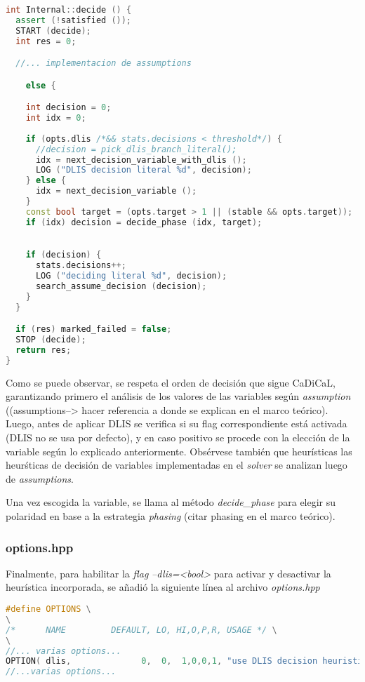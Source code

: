 \begin{lstlisting}[escapechar=!., language=C++]
int Internal::decide () {
  assert (!satisfied ());
  START (decide);
  int res = 0;

  //... implementacion de assumptions

    else {

    int decision = 0;
    int idx = 0;
    
    if (opts.dlis /*&& stats.decisions < threshold*/) {
      //decision = pick_dlis_branch_literal();
      idx = next_decision_variable_with_dlis ();
      LOG ("DLIS decision literal %d", decision);
    } else {
      idx = next_decision_variable ();
    }
    const bool target = (opts.target > 1 || (stable && opts.target));
    if (idx) decision = decide_phase (idx, target);
    

    if (decision) {
      stats.decisions++;
      LOG ("deciding literal %d", decision);
      search_assume_decision (decision);
    }
  }

  if (res) marked_failed = false;
  STOP (decide);
  return res;
}
\end{lstlisting}

Como se puede observar, se respeta el orden de decisi\'on que sigue CaDiCaL, garantizando primero el an\'alisis de los valores de las variables seg\'un \textit{assumption} ((assumptions--> hacer referencia a donde se explican en el marco te\'orico). Luego, antes de aplicar DLIS se verifica si su flag correspondiente est\'a activada (DLIS no se usa por defecto), y en caso positivo se procede con la elecci\'on de la variable seg\'un lo explicado anteriormente. Obs\'ervese tambi\'en que heur\'isticas las heur\'sticas de decisi\'on de variables implementadas en el \textit{solver} se analizan luego de \textit{assumptions}.

Una vez escogida la variable, se llama al m\'etodo \textit{decide\_phase} para elegir su polaridad en base a la estrategia \textit{phasing} (citar phasing en el marco te\'orico).

\subsubsection{options.hpp}
Finalmente, para habilitar la \textit{flag} \textit{--dlis=<bool>} para activar y desactivar la heur\'istica incorporada, se a\~nadi\'o la siguiente l\'inea al archivo \textit{options.hpp}

\begin{lstlisting}[escapechar=!._, language=C++]
#define OPTIONS \
\
/*      NAME         DEFAULT, LO, HI,O,P,R, USAGE */ \
\
//... varias options...
OPTION( dlis,              0,  0,  1,0,0,1, "use DLIS decision heuristic") \
//...varias options...
\end{lstlisting}

